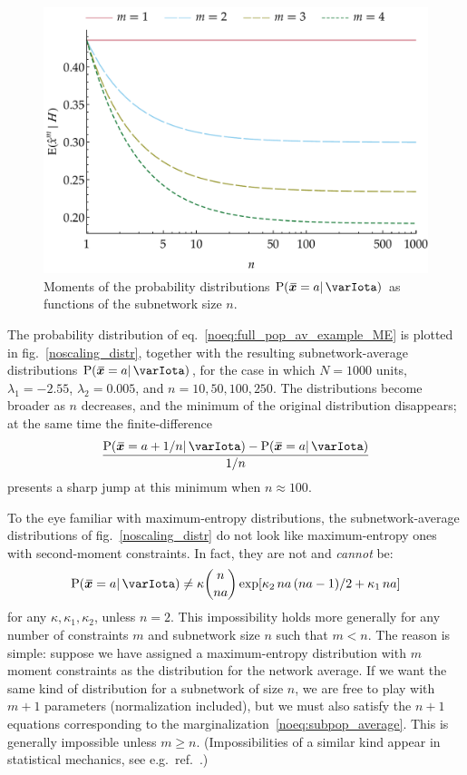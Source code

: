 \documentclass{article}
\theoremstyle{remark}
\theoremstyle{innote}
\newcommand*{\citep}{\parencites}
\renewcommand*{\|}{\mathpunct{|}}%
\renewcommand{\ge}{\geqslant}%
\newcommand*{\p}{\mathrm{P}}%
\newcommand*{\eqn}{eq.}%
\newcommand*{\fig}{fig.}%
\newcommand*{\eg}{{e.g.}}
\theoremstyle{simple}
\newcommand*{\widebar}[1]{{\mkern1.5mu\skew{2}\overline{\mkern-1.5mu#1\mkern-1.5mu}\mkern 1.5mu}}
\newcommand*{\sav}{\widebar} %
\newcommand*{\yxx}{x}%
\newcommand*{\yx}{\bm{\yxx}}%
\newcommand*{\yxs}{\sav{\yx}}%
\newcommand*{\yH}{\varIota}
\newcommand*{\yk}{\kappa}
\begin{document}
\begin{figure}[!b]
\centering
\includegraphics[width=0.95\columnwidth]{scaling_subpop_moments.pdf}%
\caption{Moments of the probability distributions $\p(\yxs =a \|
  \yH)$ as functions of the subnetwork size $n$.}
\label{noscaling_moments}
\end{figure}

The probability distribution of \eqn~\eqref{noeq:full_pop_av_example_ME} is
plotted in \fig~\ref{noscaling_distr}, together with the resulting
subnetwork-average distributions $\p(\yxs = a \|\yH)$, for the case in
which $N = 1000$ units, $\lambda_1=-2.55$, $\lambda_2=0.005$, and
$n=10, 50, 100, 250$. The distributions become broader as $n$ decreases,
and the minimum of the original distribution disappears; at the same time
the finite-difference 
\[\frac{\p(\yxs=a+1/n\|\yH)-\p(\yxs=a\|\yH)}{1/n}\]
presents a sharp jump at this minimum when $n\approx 100$.

To the eye familiar with maximum-entropy distributions, the
subnetwork-average distributions of \fig~\ref{noscaling_distr} do not look
like maximum-entropy ones with second-moment constraints. In fact,
they are not and \emph{cannot} be:
\begin{equation}
  \label{noeq:maxent_form_sub}
  \p(\yxs =a  \| \yH)
\ne\kappa\binom{n}{n a}\exp[\yk_2\, n a\,(n a-1)/2 + \yk_1\, n a]
\end{equation}
for any $\kappa, \yk_1, \yk_2$, unless $n=2$. This impossibility holds more
generally for any number of constraints $m$ and subnetwork size $n$ such
that $m<n$. The reason is simple: suppose we have assigned a
maximum-entropy distribution with $m$ moment constraints as the
distribution for the network average. If we want the same kind of
distribution for a subnetwork of size $n$, we are free to play with $m+1$
parameters (normalization included), but we must also satisfy the $n+1$
equations corresponding to the marginalization~\eqref{noeq:subpop_average}.
This is generally impossible unless $m \ge n$. (Impossibilities of a
similar kind appear in statistical mechanics, see \eg\
ref.~\citep{maesetal1999}.)
\end{document}
